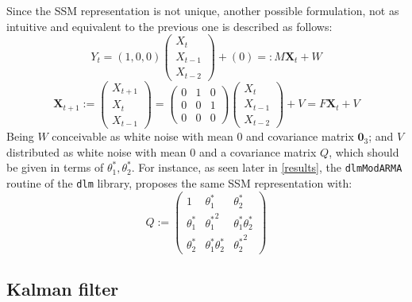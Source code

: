\documentclass{article}
\theoremstyle{definition}
\theoremstyle{definition}
\theoremstyle{remark}
\theoremstyle{mythmstyle}
\begin{document}
Since the SSM representation is not unique, another possible formulation, not as intuitive and equivalent to the previous one is described as follows:
\begin{equation}\label{eq:prop_obs}
     Y_t = ( 1, 0, 0 ) \begin{pmatrix}
    X_{t} \\ X_{t-1} \\ X_{t-2}
    \end{pmatrix} + (0) =: M \mathbf{X}_t + W   
 \end{equation} \begin{equation}\label{eq:prop_state}
     \bm{X}_{t+1} := \begin{pmatrix}
     X_{t+1} \\ X_{t} \\ X_{t-1}
     \end{pmatrix} = \begin{pmatrix}
      0 & 1 & 0 \\ 0 & 0  & 1 \\ 0 & 0 & 0 
     \end{pmatrix}
     \begin{pmatrix}
     X_{t} \\ X_{t-1} \\ X_{t-2}
     \end{pmatrix} + V = F \mathbf{X}_t + V
 \end{equation}
Being $W$ conceivable as white noise with mean 0 and covariance matrix $\mathbf{0}_{3}$; and $V$ distributed as white noise with mean 0 and a covariance matrix $Q$, which should be given in terms of $\theta_1^*, \theta_2^*$. For instance, as seen later in \ref{results}, the \texttt{dlmModARMA} routine of the \texttt{dlm} library, proposes the same SSM representation with:
\begin{equation}
    Q := \begin{pmatrix}
         1 & \theta_1^* & \theta_2^* \\
      \theta_1^* & {\theta_1^*}^2 & \theta_1^* \theta_2^* \\ 
      \theta_2^* & \theta_1^* \theta_2^* & {\theta_2^*}^2
     \end{pmatrix}
\end{equation}

\subsection{Kalman filter}
\end{document}
